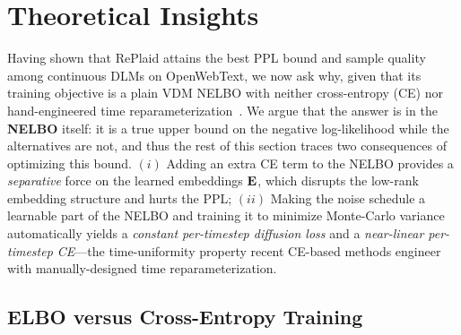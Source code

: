\documentclass{article}
\begin{document}
%

%

%

%

%

%

%
\section{Theoretical Insights}
\label{sec:theory}
%
Having shown that RePlaid attains the best PPL bound and sample quality among continuous DLMs on OpenWebText, we now ask why, given that its training objective is a plain VDM NELBO with neither cross-entropy (CE) nor hand-engineered time reparameterization~\citep{dieleman2022continuous,lee2026flow, potaptchik2026discrete, roos2026categorical, chen2026langflow}. We argue that the answer is in the \textbf{NELBO} itself: it is a true upper bound on the negative log-likelihood while the alternatives are not, and thus the rest of this section traces two consequences of optimizing this bound. $(i)$ Adding an extra CE term to the NELBO provides a \textit{separative} force on the learned embeddings ${\mathbf E}$, which disrupts the low-rank embedding structure and hurts the PPL; $(ii)$ Making the noise schedule a learnable part of the NELBO and training it to minimize Monte-Carlo variance automatically yields a \textit{constant per-timestep diffusion loss} and a \textit{near-linear per-timestep CE}---the time-uniformity property recent CE-based methods engineer with manually-designed time reparameterization.

%
%

%
%


%

%

%

%

%





\subsection{ELBO versus Cross-Entropy Training}
\label{subsec:geometric_reg}
%

%


%

%
\end{document}
